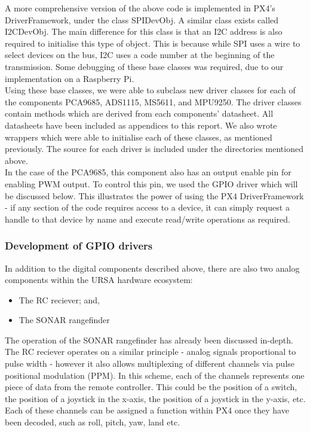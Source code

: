 \documentclass[capstone_report.tex]{subfiles}
\begin{document}
    A more comprehensive version of the above code is implemented in PX4's DriverFramework, under the class SPIDevObj. A similar class exists called I2CDevObj. The main difference for this class is that an I2C address is also required to initialise this type of object. This is because while SPI uses a wire to select devices on the bus, I2C uses a code number at the beginning of the transmission. Some debugging of these base classes was required, due to our implementation on a Raspberry Pi. \\

    Using these base classes, we were able to subclass new driver classes for each of the components PCA9685, ADS1115, MS5611, and MPU9250. The driver classes contain methods which are derived from each components' datasheet. All datasheets have been included as appendices to this report. We also wrote wrappers which were able to initialise each of these classes, as mentioned previously. The source for each driver is included under the directories mentioned above.\\

    In the case of the PCA9685, this component also has an output enable pin for enabling PWM output. To control this pin, we used the GPIO driver which will be discussed below. This illustrates the power of using the PX4 DriverFramework - if any section of the code requires access to a device, it can simply request a handle to that device by name and execute read/write operations as required.

    \subsubsection{Development of GPIO drivers}
    In addition to the digital components described above, there are also two analog components within the URSA hardware ecosystem:
    \begin{itemize}
        \item The RC reciever; and,
        \item The SONAR rangefinder 
    \end{itemize}

    The operation of the SONAR rangefinder has already been discussed in-depth. The RC reciever operates on a similar principle - analog signals proportional to pulse width - however it also allows multiplexing of different channels via pulse positional modulation (PPM). In this scheme, each of the channels represents one piece of data from the remote controller. This could be the position of a switch, the position of a joystick in the x-axis, the position of a joystick in the y-axis, etc. Each of these channels can be assigned a function within PX4 once they have been decoded, such as roll, pitch, yaw, land etc.\\
\end{document}
